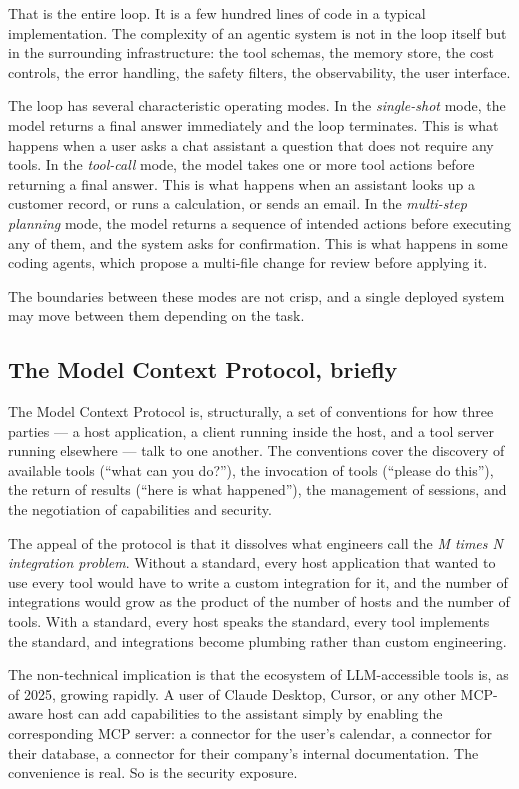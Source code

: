 That is the entire loop. It is a few hundred lines of code in
a typical implementation. The complexity of an agentic
system is not in the loop itself but in the surrounding
infrastructure: the tool schemas, the memory store, the cost
controls, the error handling, the safety filters, the
observability, the user interface.

The loop has several characteristic operating modes. In the
\emph{single-shot} mode, the model returns a final answer
immediately and the loop terminates. This is what happens when
a user asks a chat assistant a question that does not require
any tools. In the \emph{tool-call} mode, the model takes one or
more tool actions before returning a final answer. This is
what happens when an assistant looks up a customer record, or
runs a calculation, or sends an email. In the
\emph{multi-step planning} mode, the model returns a sequence
of intended actions before executing any of them, and the
system asks for confirmation. This is what happens in some
coding agents, which propose a multi-file change for review
before applying it.

The boundaries between these modes are not crisp, and a single
deployed system may move between them depending on the task.

\subsection*{The Model Context Protocol, briefly}

The Model Context Protocol is, structurally, a set of
conventions for how three parties --- a host application, a
client running inside the host, and a tool server running
elsewhere --- talk to one another. The conventions cover the
discovery of available tools (``what can you do?''), the
invocation of tools (``please do this''), the return of
results (``here is what happened''), the management of
sessions, and the negotiation of capabilities and security.

The appeal of the protocol is that it dissolves what
engineers call the \emph{M times N integration problem}.
Without a standard, every host application that wanted to use
every tool would have to write a custom integration for it,
and the number of integrations would grow as the product of
the number of hosts and the number of tools. With a standard,
every host speaks the standard, every tool implements the
standard, and integrations become plumbing rather than custom
engineering.

The non-technical implication is that the ecosystem of
LLM-accessible tools is, as of 2025, growing rapidly. A user
of Claude Desktop, Cursor, or any other MCP-aware host can
add capabilities to the assistant simply by enabling the
corresponding MCP server: a connector for the user's
calendar, a connector for their database, a connector for
their company's internal documentation. The convenience is
real. So is the security exposure.

